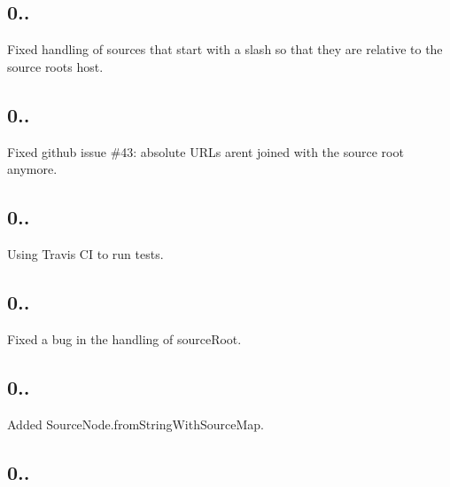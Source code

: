 \subsection*{0..}


\begin{DoxyItemize}
\item Fixed handling of sources that start with a slash so that they are relative to the source root\textquotesingle{}s host.
\end{DoxyItemize}

\subsection*{0..}


\begin{DoxyItemize}
\item Fixed github issue \#43\+: absolute U\+R\+Ls aren\textquotesingle{}t joined with the source root anymore.
\end{DoxyItemize}

\subsection*{0..}


\begin{DoxyItemize}
\item Using Travis C\+I to run tests.
\end{DoxyItemize}

\subsection*{0..}


\begin{DoxyItemize}
\item Fixed a bug in the handling of source\+Root.
\end{DoxyItemize}

\subsection*{0..}


\begin{DoxyItemize}
\item Added Source\+Node.\+from\+String\+With\+Source\+Map.
\end{DoxyItemize}

\subsection*{0..}


